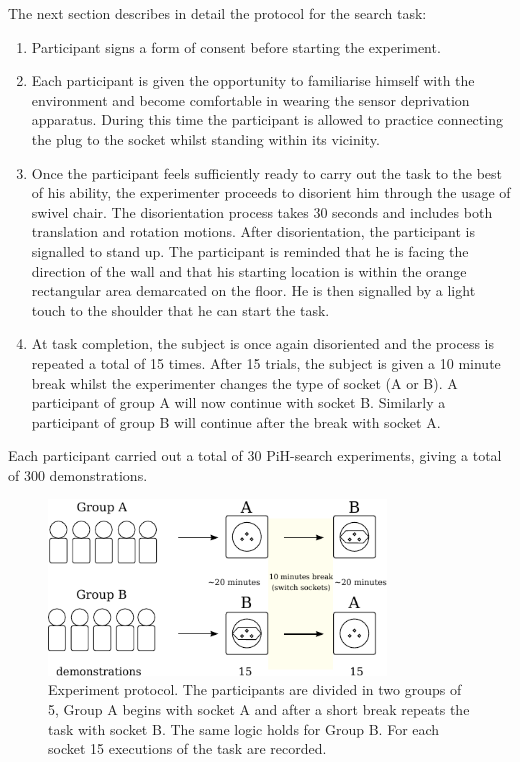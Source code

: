 The next section describes in detail the protocol for the search task:

\begin{enumerate}
 \item Participant signs a form of consent before starting the experiment.
 \item Each participant is given the opportunity to familiarise himself with the environment and become 
 comfortable in wearing the sensor deprivation apparatus.
 During this time the participant is allowed to practice connecting the plug to the socket whilst standing within its vicinity.  
 \item Once the participant feels sufficiently ready to carry out the task to the best of his ability, the experimenter 
  proceeds to disorient him through the usage of swivel chair. The disorientation process takes 30 seconds and includes
  both translation and rotation motions. After disorientation, the participant is signalled to stand up. The participant
  is reminded that he is facing the direction of the wall and that his starting location is within the orange 
  rectangular area demarcated on the floor. He is then signalled by a light touch to the shoulder 
  that he can start the task.
  \item At task completion, the subject is once again disoriented and the process is repeated a total of 15 times.
  After 15 trials, the subject is given a 10 minute break whilst the experimenter changes the type of socket (A or B). 
  A participant of group A will now continue with socket B. Similarly a participant of group B will continue after the break 
  with socket A.
\end{enumerate}

Each participant carried out a total of 30 PiH-search experiments, giving a total of 300 demonstrations.

\begin{figure}
\centering
 \includegraphics[width=0.8\textwidth]{./ch4-PiH/Figures/Fig/experiment_design_v2.pdf}
 \caption{Experiment protocol. The participants are divided in two groups of 5, Group A begins with socket A 
 and after a short break repeats the task with socket B. The same logic holds for Group B.
 For each socket 15 executions of the task are recorded.}
 \label{fig:experiment_design}
\end{figure}

